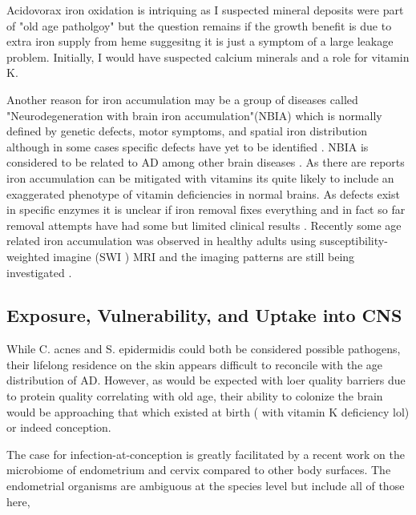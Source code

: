 \documentclass[aps,secnumarabic,balancelastpage,amsmath,amssymb,nofootinbib]{revtex4}
\begin{document}
Acidovorax iron oxidation  is intriquing as I suspected mineral deposits were part
of "old age patholgoy" but the question remains if the growth
benefit is due to extra iron supply from heme suggesitng
it is just a symptom of a large leakage problem. Initially, 
I would have suspected calcium minerals and a role for vitamin K.

Another reason for iron accumulation may be a group of
diseases called "Neurodegeneration with brain iron accumulation"(NBIA)
which is normally defined by genetic defects, motor symptoms, and spatial
iron distribution although in some cases specific
defects have yet to be identified
\cite{KURIAN_MCNEILL_LIN_Childhood_disorders_neurodegeneration_2011}
. 
NBIA is considered to be related to AD among other brain diseases
\cite{WANG2019109068}.
As there are reports iron accumulation can be mitigated with vitamins 
\cite{PMC9364590} \cite{PMC10091671}
its quite likely to include  an exaggerated
phenotype of vitamin deficiencies in normal brains. 
As defects exist in specific enzymes 
it is unclear if iron removal fixes everything and in fact
so far removal attempts have had some but limited clinical results
\cite{10.3389/fneur.2021.629414}.
Recently some age related iron accumulation
was observed in healthy adults using susceptibility-weighted imagine
(SWI )  MRI \cite{vanderWeijden_vanLaar_Lambrechts_Cortical_pencil_lining_2019}
and the imaging patterns are still being investigated 
\cite{10.3389/fneur.2020.01024}.

 
\subsection{Exposure, Vulnerability, and Uptake into CNS }


While C. acnes and S. epidermidis could both
be considered possible pathogens, their lifelong
residence on the skin appears difficult to
reconcile with the age distribution of AD.
However, as would be expected with loer quality
barriers due to protein quality correlating
with old age, their ability to colonize
the brain would be approaching that
which existed at birth ( with vitamin K deficiency lol)
 or indeed conception.


The case for infection-at-conception is greatly 
facilitated by a recent work on the microbiome
of endometrium and cervix compared to other 
body surfaces. The endometrial organisms are ambiguous at
the species level but include all of those here,
\end{document}
